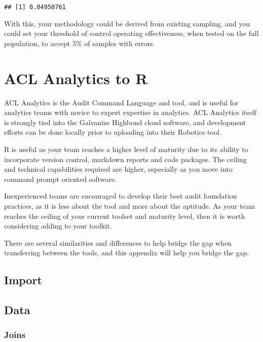 \documentclass[
]{book}
\begin{document}
\begin{verbatim}
## [1] 0.04950761
\end{verbatim}

With this, your methodology could be derived from existing sampling, and you could set your threshold of control operating effectiveness, when tested on the full population, to accept 5\% of samples with errors.

\hypertarget{acl-analytics-to-r}{%
\chapter{ACL Analytics to R}\label{acl-analytics-to-r}}

ACL Analytics is the Audit Command Language and tool, and is useful for analytics teams with novice to expert expertise in analytics. ACL Analytics itself is strongly tied into the Galvanize Highbond cloud software, and development efforts can be done locally prior to uploading into their Robotics tool.

R is useful as your team reaches a higher level of maturity due to its ability to incorporate version control, markdown reports and code packages. The ceiling and technical capabilities required are higher, especially as you move into command prompt oriented software.

Inexperienced teams are encouraged to develop their best audit foundation practices, as it is less about the tool and more about the aptitude. As your team reaches the ceiling of your current toolset and maturity level, then it is worth considering adding to your toolkit.

There are several similarities and differences to help bridge the gap when transferring between the tools, and this appendix will help you bridge the gap.

\hypertarget{import}{%
\section{Import}\label{import}}

\hypertarget{data}{%
\section{Data}\label{data}}

\hypertarget{joins}{%
\subsection{Joins}\label{joins}}
\end{document}
